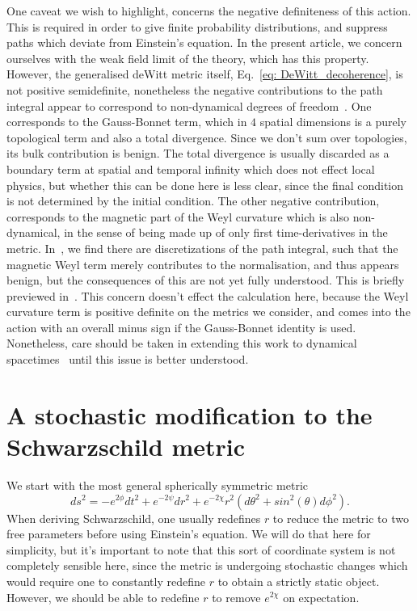 \documentclass[aps,pra,amsmath,amssymb,amsthm,floatfix,nofootinbib,notitlepage,superscriptaddress,10pt]{revtex4-2}
\begin{document}
One caveat we wish to highlight, concerns the negative definiteness of this action. This is required in order to give finite probability distributions, and suppress paths which deviate from Einstein's equation. In the present article, we concern ourselves with the weak field limit of the theory, which has this property. However, the generalised deWitt metric itself, Eq.~\eqref{eq: DeWitt_decoherence}, is not positive semidefinite, nonetheless the negative contributions to the path integral appear to correspond to non-dynamical degrees of freedom~\cite{grudka2023renormalisable,UCLnorm2023}. One corresponds to the Gauss-Bonnet term, which in $4$ spatial dimensions is a purely topological term and also a total divergence. Since we don't sum over topologies, its bulk contribution is benign. The total divergence is usually discarded as a boundary term at spatial and temporal infinity which does not effect local physics, but whether this can be done here is less clear, since the final condition is not determined by the initial condition. The other negative contribution, corresponds to the magnetic part of the Weyl curvature which is also non-dynamical, in the sense of being made up of only first time-derivatives in the metric. In~\cite{UCLnorm2023}, we find there are discretizations of the path integral, such that the magnetic Weyl term merely contributes to the normalisation, and thus appears benign, but the consequences of this are not yet fully understood. This is briefly previewed in~\cite{grudka2023renormalisable}. This concern doesn't effect the calculation here, because the Weyl curvature term is positive definite on the metrics we consider, and comes into the action with an overall minus sign if the Gauss-Bonnet identity is used. Nonetheless, care should be taken in extending this work to dynamical spacetimes~\cite{barrow2002weyl} until this issue is better understood.

\section{A stochastic modification to the Schwarzschild metric}
\label{sec:Schwar}

We start with the most general spherically symmetric metric
\begin{equation}
	ds^2=-e^{2\phi}dt^2+e^{-2\psi}dr^2+e^{-2 \chi}r^2(d\theta^2+sin^2(\theta)d\phi^2).
\end{equation}
When deriving Schwarzschild, one usually redefines $r$ to reduce the metric to two free parameters before using Einstein's equation. We will do that here for simplicity, but it's important to note that this sort of coordinate system is not completely sensible here, since the metric is undergoing stochastic changes which would require one to constantly redefine $r$ to obtain a strictly static object. However, we should be able to redefine $r$ to remove $e^{2\chi}$ on expectation.
\end{document}
